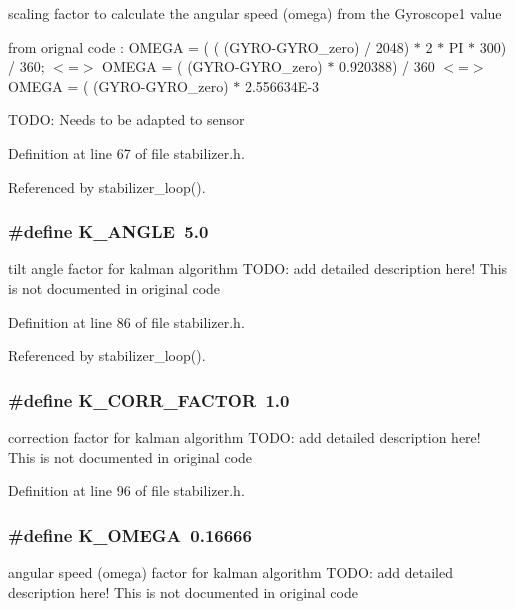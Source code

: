 scaling factor to calculate the angular speed (omega) from the Gyroscope1 value

from orignal code : OMEGA = ( ( (GYRO-GYRO\_\-zero) / 2048) $\ast$ 2 $\ast$ PI $\ast$ 300) / 360; $<$=$>$ OMEGA = ( (GYRO-GYRO\_\-zero) $\ast$ 0.920388) / 360 $<$=$>$ OMEGA = ( (GYRO-GYRO\_\-zero) $\ast$ 2.556634E-3

TODO: Needs to be adapted to sensor 

Definition at line 67 of file stabilizer.h.

Referenced by stabilizer\_\-loop().
\subsubsection{\setlength{\rightskip}{0pt plus 5cm}\#define K\_\-ANGLE~5.0}\label{stabilizer_8h_aeb0d289a6c0bcd92cf00d9ba462d816}


tilt angle factor for kalman algorithm TODO: add detailed description here! This is not documented in original code 

Definition at line 86 of file stabilizer.h.

Referenced by stabilizer\_\-loop().
\subsubsection{\setlength{\rightskip}{0pt plus 5cm}\#define K\_\-CORR\_\-FACTOR~1.0}\label{stabilizer_8h_a00a85617f61edf3a55ce70ca5261da0}


correction factor for kalman algorithm TODO: add detailed description here! This is not documented in original code 

Definition at line 96 of file stabilizer.h.
\subsubsection{\setlength{\rightskip}{0pt plus 5cm}\#define K\_\-OMEGA~0.16666}\label{stabilizer_8h_df0bd5f884ff5fc0e120a13d9de4afac}


angular speed (omega) factor for kalman algorithm TODO: add detailed description here! This is not documented in original code 

